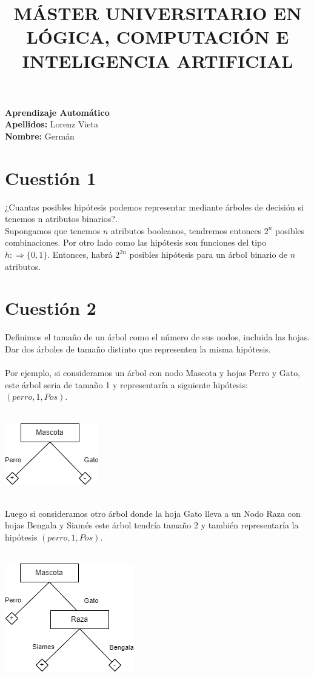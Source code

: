 \documentclass{article}
\title{\textbf{MÁSTER UNIVERSITARIO EN
LÓGICA, COMPUTACIÓN E INTELIGENCIA ARTIFICIAL}}
\date{}
\begin{document}
\maketitle
\begin{flushleft}
\textbf{Aprendizaje Automático}
\\\textbf{Apellidos:} Lorenz Vieta
\\\textbf{Nombre:} Germán
\end{flushleft}


\section*{Cuestión 1}
¿Cuantas posibles hipótesis podemos representar mediante árboles de decisión si tenemos n atributos binarios?.\\

Supongamos que tenemos \(n\) atributos booleanos, tendremos entonces \(2^n\) posibles combinaciones.
Por otro lado como las hipótesis son funciones del tipo \(h :\Rightarrow \{0,1\}\). Entonces, habrá \(2^{2n}\)
posibles hipótesis para un árbol binario de \(n\) atributos.


\section*{Cuestión 2}
Definimos el tamaño de un árbol como el número de sus nodos, incluida las hojas. Dar dos árboles de tamaño distinto que representen la misma hipótesis.\\\\

Por ejemplo, si consideramos  un árbol  con nodo Mascota y hojas Perro y Gato, este árbol seria de tamaño 1 y representaría a siguiente hipótesis: \((perro,1,Pos)\).\\\\
\begin{center}
\includegraphics[scale=0.5]{mascota_1.png}\end{center}\\
Luego si consideramos otro árbol donde la hoja Gato lleva a un Nodo Raza con hojas Bengala y Siamés este árbol tendría tamaño 2 y también representaría la hipótesis \((perro,1,Pos)\).\\\\
\begin{center}\includegraphics[scale=0.5]{mascota_2.png}\end{center}\\
\end{document}

